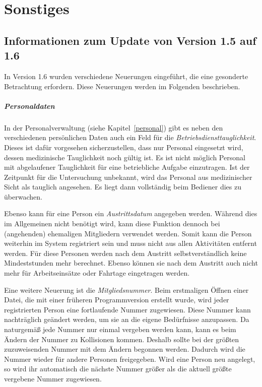 \chapter{Sonstiges}\label{sonstiges}
\section{Informationen zum Update von Version 1.5 auf 1.6}
\label{sonstiges:1.5-1.6}
In Version 1.6 wurden verschiedene Neuerungen eingeführt, die eine gesonderte Betrachtung erfordern.
Diese Neuerungen werden im Folgenden beschrieben.


\paragraph{Personaldaten}
In der Personalverwaltung (siehe Kapitel~\ref{personal}) gibt es neben den verschiedenen persönlichen Daten auch ein Feld für die \emph{Betriebsdiensttauglichkeit}.
Dieses ist dafür vorgesehen sicherzustellen, dass nur Personal eingesetzt wird, dessen medizinische Tauglichkeit noch gültig ist.
Es ist nicht möglich Personal mit abgelaufener Tauglichkeit für eine betriebliche Aufgabe einzutragen.
Ist der Zeitpunkt für die Untersuchung unbekannt, wird das Personal aus medizinischer Sicht als tauglich angesehen.
Es liegt dann vollständig beim Bediener dies zu überwachen.

Ebenso kann für eine Person ein \emph{Austrittsdatum} angegeben werden.
Während dies im Allgemeinen nicht benötigt wird, kann diese Funktion dennoch bei (angehenden) ehemaligen Mitgliedern verwendet werden.
Somit kann die Person weiterhin im System registriert sein und muss nicht aus allen Aktivitäten entfernt werden.
Für diese Personen werden nach dem Austritt selbstverständlich keine Mindeststunden mehr berechnet.
Ebenso können sie nach dem Austritt auch nicht mehr für Arbeitseinsätze oder Fahrtage eingetragen werden.

Eine weitere Neuerung ist die \emph{Mitgliedsnummer}.
Beim erstmaligen Öffnen einer Datei, die mit einer früheren Programmversion erstellt wurde, wird jeder registrierten Person eine fortlaufende Nummer zugewiesen.
Diese Nummer kann nachträglich geändert werden, um sie an die eigene Bedürfnisse anzupassen.
Da naturgemäß jede Nummer nur einmal vergeben werden kann,
kann es beim Ändern der Nummer zu Kollisionen kommen.
Deshalb sollte bei der größten zuzuweisenden Nummer mit dem Ändern begonnen werden.
Dadurch wird die Nummer wieder für andere Personen freigegeben.
Wird eine Person neu angelegt,
so wird ihr automatisch die nächste Nummer größer als die aktuell größte vergebene Nummer zugewiesen.


